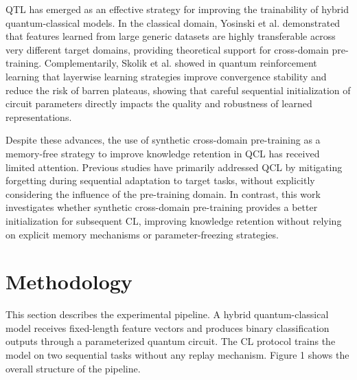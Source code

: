 \documentclass[conference]{IEEEtran}
\begin{document}
QTL has emerged as an effective strategy for improving the trainability of hybrid quantum-classical models. In the classical domain, Yosinski et al. \cite{b27} demonstrated that features learned from large generic datasets are highly transferable across very different target domains, providing theoretical support for cross-domain pre-training. Complementarily, Skolik et al. \cite{b28} showed in quantum reinforcement learning that layerwise learning strategies improve convergence stability and reduce the risk of barren plateaus, showing that careful sequential initialization of circuit parameters directly impacts the quality and robustness of learned representations.

Despite these advances, the use of synthetic cross-domain pre-training as a memory-free strategy to improve knowledge retention in QCL has received limited attention. Previous studies have primarily addressed QCL by mitigating forgetting during sequential adaptation to target tasks, without explicitly considering the influence of the pre-training domain. In contrast, this work investigates whether synthetic cross-domain pre-training provides a better initialization for subsequent CL, improving knowledge retention without relying on explicit memory mechanisms or parameter-freezing strategies.

\section{Methodology}
This section describes the experimental pipeline. A hybrid quantum-classical model receives fixed-length feature vectors and produces binary classification outputs through a parameterized quantum circuit. The CL protocol trains the model on two sequential tasks without any replay mechanism. Figure 1 shows the overall structure of the pipeline.
\end{document}
